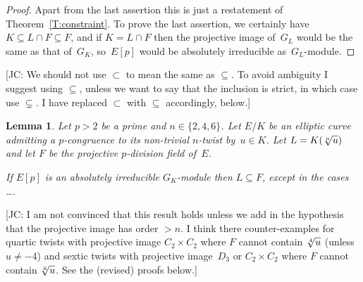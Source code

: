 \documentclass[12pt, reqno]{amsart}
\numberwithin{equation}{section}
\newtheorem{lemma}[theorem]{Lemma}
\theoremstyle{definition}
\theoremstyle{remark}
\newcommand{\jc}[1]{{\color{darkgreen} \textsf{[JC: #1]}}}
\begin{document}
\begin{proof}
Apart from the last assertion this is just a restatement of
Theorem~\ref{T:constraint}.  To prove the last assertion, we certainly
have $K\subseteq L\cap F\subseteq F$, and if $K=L\cap F$ then the
projective image of~$G_L$ would be the same as that of~$G_K$,
so~$E[p]$ would be absolutely irreducible as~$G_L$-module.
\end{proof}

\jc{We should not use $\subset$ to mean the same as $\subseteq$.  To
  avoid ambiguity I suggest using $\subseteq$, unless we want to say
  that the inclusion is strict, in which case use $\subsetneq$. I have
  replaced $\subset$ with $\subseteq$ accordingly, below.}

\begin{lemma} \label{L:LinF}
Let $p > 2$ be a prime and $n \in \{2,4,6\}$.  Let $E/K$ be an
elliptic curve admitting a $p$-congruence to its non-trivial $n$-twist
by~$u \in K$. Let $L = K(\root n \of u)$ and let $F$ be the projective
$p$-division field of~$E$.

If $E[p]$ is an absolutely irreducible $G_K$-module then $L \subseteq
F$, except in the cases \dots.
\end{lemma}

\jc{I am not convinced that this result holds unless we add in the
  hypothesis that the projective image has order $>n$.  I think there
  counter-examples for quartic twists with projective image $C_2\times
  C_2$ where $F$ cannot contain $\root4\of u$ (unless $u\not=-4$) and
  sextic twists with projective image~$D_3$ or $C_2\times C_2$ where
  $F$ cannot contain $\root6\of u$.  See the (revised) proofs below.}
\end{document}
